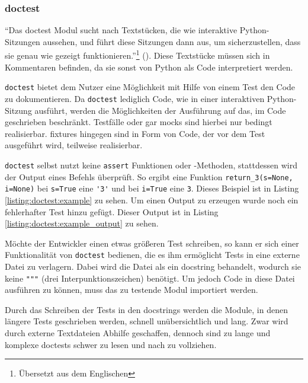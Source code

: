 \subsubsection{doctest}\label{python-tools:doctest}
"`Das doctest Modul sucht nach Textstücken, die wie interaktive Python-Sitzungen
aussehen, und führt diese Sitzungen dann aus, um sicherzustellen, dass sie genau
wie gezeigt funktionieren."'\footnote{Übersetzt aus dem Englischen}
(\cite{docs.python:doctest}). Diese Textstücke müssen sich in Kommentaren
befinden, da sie sonst von Python als Code interpretiert werden.
\newline

\lstinline{doctest} bietet dem Nutzer eine Möglichkeit mit Hilfe von einem Test
den Code zu dokumentieren. Da \lstinline{doctest} lediglich Code, wie in einer
interaktiven Python-Sitzung ausführt, werden die Möglichkeiten der Ausführung
auf das, im Code geschrieben beschränkt. Testfälle oder gar
\Glspl{mock} sind hierbei nur bedingt realisierbar. \Glspl{fixture} hingegen
sind in Form von Code, der vor dem Test ausgeführt wird, teilweise realisierbar.

\lstinline{doctest} selbst nutzt keine \lstinline{assert} Funktionen oder
-Methoden, stattdessen wird der Output eines Befehls überprüft. So ergibt eine
Funktion \lstinline{return_3(s=None, i=None)} bei \lstinline{s=True} eine
\lstinline{'3'} und bei \lstinline{i=True} eine \lstinline{3}. Dieses Beispiel 
ist in Listing \ref{listing:doctest:example} zu sehen. Um einen Output zu 
erzeugen wurde noch ein fehlerhafter Test hinzu gefügt. Dieser Output ist in 
Listing \ref{listing:doctest:example_output} zu sehen.

Möchte der Entwickler einen etwas größeren Test schreiben, so kann er sich einer
Funktionalität von \lstinline{doctest} bedienen, die es ihm ermöglicht Tests in
eine externe Datei zu verlagern. Dabei wird die Datei als ein \Gls{docstring}
behandelt, wodurch sie keine \lstinline{"""} (drei Interpunktionszeichen) 
benötigt. Um jedoch Code in diese Datei ausführen zu können, muss das zu 
testende Modul importiert werden.

Durch das Schreiben der Tests in den \Glspl{docstring} werden die Module, in
denen längere Tests geschrieben werden, schnell unübersichtlich und lang.
Zwar wird durch externe Textdateien Abhilfe geschaffen, dennoch sind zu lange 
und komplexe doctests schwer zu lesen und nach zu vollziehen.
\newline

